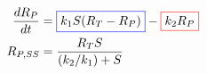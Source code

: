 \documentclass[preview]{standalone}
\begin{document}
\pagestyle{empty}
\begin{equation*}
\begin{aligned}
	\frac{dR_P}{dt} & = {\color{blue}\boxed{\color{black}k_1 S (R_T - R_P)}} - \color{red}{\boxed{\color{black}k_2 R_P}} \\ 
	R_{P, SS} & = \frac{R_T S}{(k_2/k_1) + S}
\end{aligned}
\end{equation*}
\vfill
\end{document}

